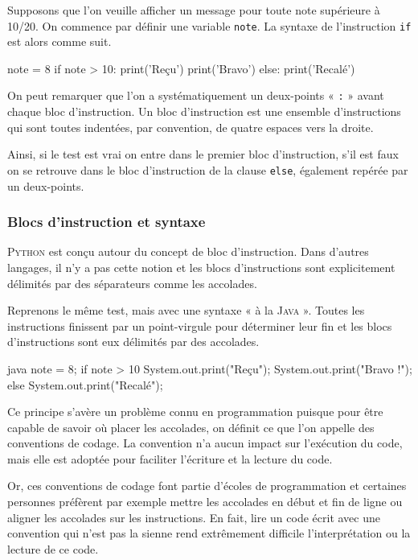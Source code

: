 Supposons que l'on veuille afficher un message pour toute note supérieure à 10/20. On commence par définir une variable \texttt{note}. La syntaxe de l'instruction \texttt{if} est alors comme suit.

\begin{idleconsole}
\begin{pyconsole}
note = 8
if note > 10:
    print('Reçu')
    print('Bravo')
else:
    print('Recalé')

\end{pyconsole}
\end{idleconsole}

On peut remarquer que l'on a systématiquement un deux-points « \texttt{:} » avant chaque bloc d'instruction. Un bloc d'instruction est une ensemble d'instructions qui sont toutes indentées, par convention, de quatre espaces vers la droite.

Ainsi, si le test est vrai on entre dans le premier bloc d'instruction, s'il est faux on se retrouve dans le bloc d'instruction de la clause \texttt{else}, également repérée par un deux-points.

\subsubsection[Blocs d'instruction et syntaxe]{Blocs d'instruction et syntaxe}
\label{subsub:XI.3.1.2}


\textsc{Python} est conçu autour du concept de bloc d'instruction. Dans d'autres langages, il n'y a pas cette notion et les blocs d’instructions sont explicitement délimités par des séparateurs comme les accolades.

Reprenons le même test, mais avec une syntaxe « à la \textsc{Java} ». Toutes les instructions finissent par un point-virgule pour déterminer leur fin et les blocs d'instructions sont eux délimités par des accolades. 

\begin{code*}{java}
note = 8;
if note > 10 {
  System.out.print("Reçu");
  System.out.print("Bravo !");
  }
else
  { System.out.print("Recalé"); }
\end{code*}

Ce principe s'avère un problème connu en programmation puisque pour être capable de savoir où placer les accolades, on définit ce que l'on appelle des conventions de codage. La convention n'a aucun impact sur l'exécution du code, mais elle est adoptée pour faciliter l'écriture et la lecture du code. 

Or, ces conventions de codage font partie d'écoles de programmation et certaines personnes préfèrent par exemple mettre les accolades en début et fin de ligne ou aligner les accolades sur les instructions. En fait, lire un code écrit avec une convention qui n'est pas la sienne rend extrêmement difficile l'interprétation ou la lecture de ce code.

